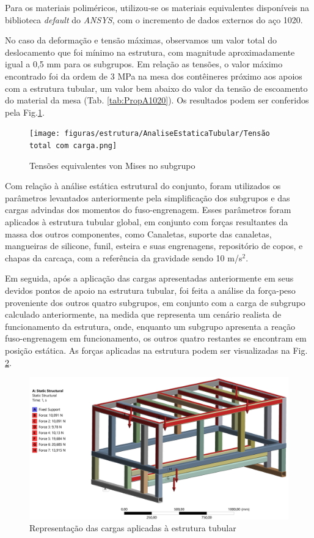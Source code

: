 Para os materiais poliméricos, utilizou-se os materiais equivalentes disponíveis na biblioteca \textit{default} do \textit{ANSYS}, com o incremento de dados externos do aço 1020.

No caso da deformação e tensão máximas, observamos um valor total do deslocamento que foi mínimo na estrutura, com magnitude aproximadamente igual a 0,5 mm para os subgrupos. Em relação as tensões, o valor máximo encontrado foi da ordem de 3 MPa na mesa dos contêineres próximo aos apoios com a estrutura tubular, um valor bem abaixo do valor da tensão de escoamento do material da mesa (Tab. \ref{tab:PropA1020}). Os resultados podem ser conferidos pela Fig.\ref{fig:tensao_subgrupo}.

\begin{figure}[ht]
    \centering
    \texttt{[image: figuras/estrutura/AnaliseEstaticaTubular/Tensão total com carga.png]}
    \caption{Tensões equivalentes von Mises no subgrupo }
    \label{fig:tensao_subgrupo}
\end{figure}

Com relação à análise estática estrutural do conjunto, foram utilizados os parâmetros levantados anteriormente pela simplificação dos subgrupos e das cargas advindas dos momentos do fuso-engrenagem. Esses parâmetros foram aplicados à estrutura tubular global, em conjunto com forças resultantes da massa dos outros componentes, como Canaletas, suporte das canaletas, mangueiras de silicone, funil, esteira e suas engrenagens, repositório de copos, e chapas da carcaça, com a referência da gravidade sendo 10 m/s$^2$. 

Em seguida, após a aplicação das cargas apresentadas anteriormente em seus devidos pontos de apoio na estrutura tubular, foi feita a análise da força-peso proveniente dos outros quatro subgrupos, em conjunto com a carga de subgrupo calculado anteriormente, na medida que representa um cenário realista de funcionamento da estrutura, onde, enquanto um subgrupo apresenta a reação fuso-engrenagem em funcionamento, os outros quatro restantes se encontram em posição estática. As forças aplicadas na estrutura podem ser visualizadas na Fig. \ref{fig:carga_estruturatubular}.

\begin{figure}[ht]
    \centering
    \includegraphics[width=1\textwidth]{figuras/estrutura/AnaliseEstaticaTubular/Cargas_Estrutura.png}
    \caption{Representação das cargas aplicadas à estrutura tubular }
    \label{fig:carga_estruturatubular}
\end{figure}


